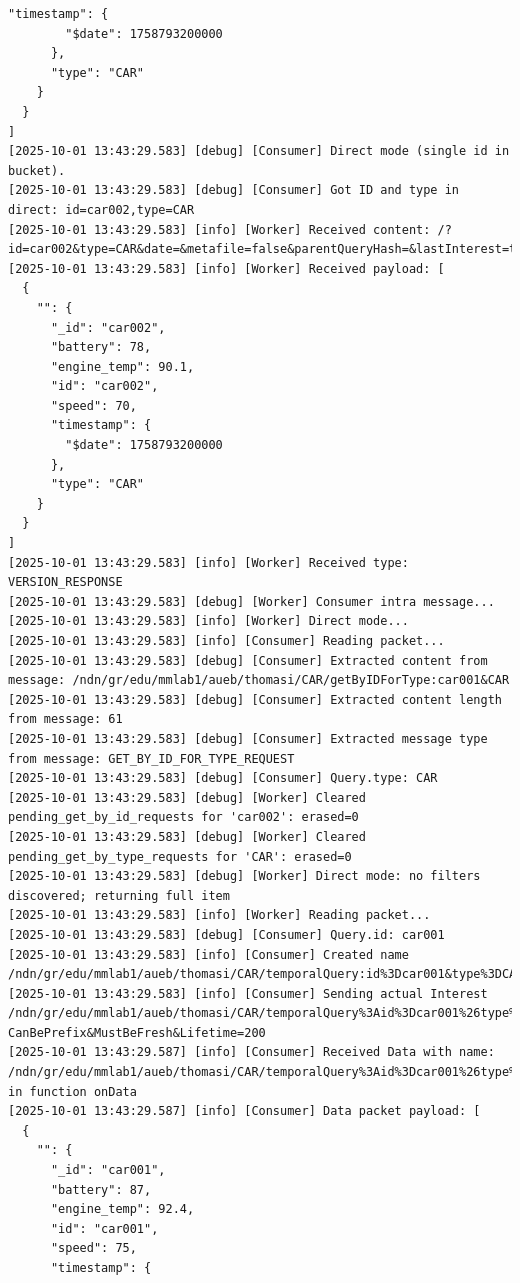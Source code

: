 \documentclass{article}
\begin{document}
\begin{lstlisting}[language=log, caption={\emph{MMLab2} after receive a response for its \emph{GET by TYPE} request for \textit{@type=CAR}}, label={lst:response-from-get-by-type}]
      "timestamp": {
        "$date": 1758793200000
      },
      "type": "CAR"
    }
  }
]
[2025-10-01 13:43:29.583] [debug] [Consumer] Direct mode (single id in bucket).
[2025-10-01 13:43:29.583] [debug] [Consumer] Got ID and type in direct: id=car002,type=CAR
[2025-10-01 13:43:29.583] [info] [Worker] Received content: /?id=car002&type=CAR&date=&metafile=false&parentQueryHash=&lastInterest=true&mode=direct
[2025-10-01 13:43:29.583] [info] [Worker] Received payload: [
  {
    "": {
      "_id": "car002",
      "battery": 78,
      "engine_temp": 90.1,
      "id": "car002",
      "speed": 70,
      "timestamp": {
        "$date": 1758793200000
      },
      "type": "CAR"
    }
  }
]
[2025-10-01 13:43:29.583] [info] [Worker] Received type: VERSION_RESPONSE
[2025-10-01 13:43:29.583] [debug] [Worker] Consumer intra message...
[2025-10-01 13:43:29.583] [info] [Worker] Direct mode...
[2025-10-01 13:43:29.583] [info] [Consumer] Reading packet...
[2025-10-01 13:43:29.583] [debug] [Consumer] Extracted content from message: /ndn/gr/edu/mmlab1/aueb/thomasi/CAR/getByIDForType:car001&CAR
[2025-10-01 13:43:29.583] [debug] [Consumer] Extracted content length from message: 61
[2025-10-01 13:43:29.583] [debug] [Consumer] Extracted message type from message: GET_BY_ID_FOR_TYPE_REQUEST
[2025-10-01 13:43:29.583] [debug] [Consumer] Query.type: CAR
[2025-10-01 13:43:29.583] [debug] [Worker] Cleared pending_get_by_id_requests for 'car002': erased=0
[2025-10-01 13:43:29.583] [debug] [Worker] Cleared pending_get_by_type_requests for 'CAR': erased=0
[2025-10-01 13:43:29.583] [debug] [Worker] Direct mode: no filters discovered; returning full item
[2025-10-01 13:43:29.583] [info] [Worker] Reading packet...
[2025-10-01 13:43:29.583] [debug] [Consumer] Query.id: car001
[2025-10-01 13:43:29.583] [info] [Consumer] Created name /ndn/gr/edu/mmlab1/aueb/thomasi/CAR/temporalQuery:id%3Dcar001&type%3DCAR&date%3D&count%3D&timeframe%3D&filters%3D
[2025-10-01 13:43:29.583] [info] [Consumer] Sending actual Interest /ndn/gr/edu/mmlab1/aueb/thomasi/CAR/temporalQuery%3Aid%3Dcar001%26type%3DCAR%26date%3D%26count%3D%26timeframe%3D%26filters%3D?CanBePrefix&MustBeFresh&Lifetime=200
[2025-10-01 13:43:29.587] [info] [Consumer] Received Data with name: /ndn/gr/edu/mmlab1/aueb/thomasi/CAR/temporalQuery%3Aid%3Dcar001%26type%3DCAR%26date%3D%26count%3D%26timeframe%3D%26filters%3D in function onData
[2025-10-01 13:43:29.587] [info] [Consumer] Data packet payload: [
  {
    "": {
      "_id": "car001",
      "battery": 87,
      "engine_temp": 92.4,
      "id": "car001",
      "speed": 75,
      "timestamp": {

\end{lstlisting}
\end{document}
